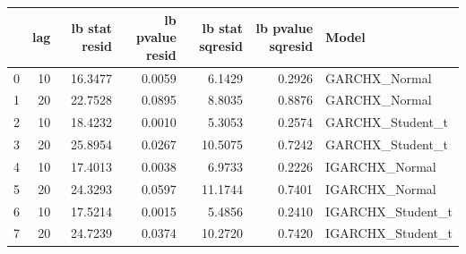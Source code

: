\begin{table}[htbp]
\centering
\begin{tabular}{lrrrrrl}
\toprule
 & lag & lb stat resid & lb pvalue resid & lb stat sqresid & lb pvalue sqresid & Model \\
\midrule
0 & 10 & 16.3477 & 0.0059 & 6.1429 & 0.2926 & GARCHX_Normal \\
1 & 20 & 22.7528 & 0.0895 & 8.8035 & 0.8876 & GARCHX_Normal \\
2 & 10 & 18.4232 & 0.0010 & 5.3053 & 0.2574 & GARCHX_Student_t \\
3 & 20 & 25.8954 & 0.0267 & 10.5075 & 0.7242 & GARCHX_Student_t \\
4 & 10 & 17.4013 & 0.0038 & 6.9733 & 0.2226 & IGARCHX_Normal \\
5 & 20 & 24.3293 & 0.0597 & 11.1744 & 0.7401 & IGARCHX_Normal \\
6 & 10 & 17.5214 & 0.0015 & 5.4856 & 0.2410 & IGARCHX_Student_t \\
7 & 20 & 24.7239 & 0.0374 & 10.2720 & 0.7420 & IGARCHX_Student_t \\
\bottomrule
\end{tabular}
\label{tab:garch_sentiment_diagnostics}
\end{table}
